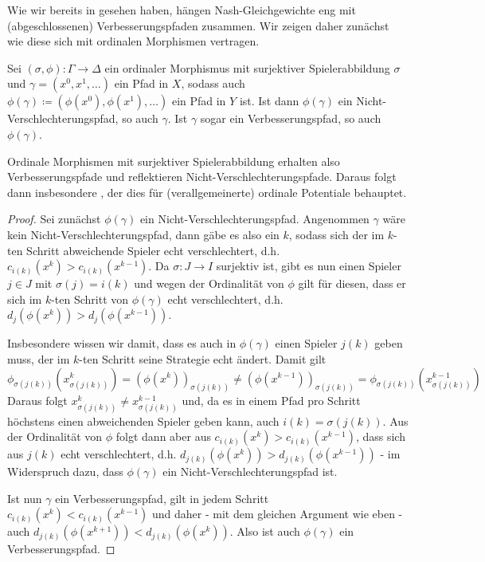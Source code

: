 Wie wir bereits in  gesehen haben, hängen Nash-Gleichgewichte eng mit (abgeschlossenen) Verbesserungspfaden zusammen. Wir zeigen daher zunächst wie diese sich mit ordinalen Morphismen vertragen.

\begin{prop}\label{prop:NVReflVerbErh}
	Sei $(\sigma, \phi): \Gamma \to \Delta$ ein ordinaler Morphismus mit surjektiver Spielerabbildung $\sigma$ und $\gamma = (x^0, x^1, \dots)$ ein Pfad in $X$, sodass auch $\phi(\gamma) \coloneqq (\phi(x^0), \phi(x^1), \dots)$ ein Pfad in $Y$ ist. Ist dann $\phi(\gamma)$ ein Nicht-Verschlechterungspfad, so auch $\gamma$. Ist $\gamma$ sogar ein Verbesserungspfad, so auch $\phi(\gamma)$.
\end{prop}

Ordinale Morphismen mit surjektiver Spielerabbildung erhalten also Verbesserungspfade und reflektieren Nicht-Verschlechterungspfade. Daraus folgt dann insbesondere , der dies für (verallgemeinerte) ordinale Potentiale behauptet.

\begin{proof}
	Sei zunächst $\phi(\gamma)$ ein Nicht-Verschlechterungspfad. Angenommen $\gamma$ wäre kein Nicht-Verschlechterungspfad, dann gäbe es also ein $k$, sodass sich der im $k$-ten Schritt abweichende Spieler echt verschlechtert, d.h. $c_{i(k)}(x^k) > c_{i(k)}(x^{k-1})$. Da $\sigma: J \to I$ surjektiv ist, gibt es nun einen Spieler $j \in J$ mit $\sigma(j) = i(k)$ und wegen der Ordinalität von $\phi$ gilt für diesen, dass er sich im $k$-ten Schritt von $\phi(\gamma)$ echt verschlechtert, d.h. $d_j(\phi(x^k)) > d_j(\phi(x^{k-1}))$. 
	
	Insbesondere wissen wir damit, dass es auch in $\phi(\gamma)$ einen Spieler $j(k)$ geben muss, der im $k$-ten Schritt seine Strategie echt ändert. Damit gilt
		\[\phi_{\sigma(j(k))}\left(x_{\sigma(j(k))}^k\right) = \left(\phi(x^k)\right)_{\sigma(j(k))} \neq \left(\phi(x^{k-1})\right)_{\sigma(j(k))} = \phi_{\sigma(j(k))}\left(x_{\sigma(j(k))}^{k-1}\right)\]
	Daraus folgt $x_{\sigma(j(k))}^k \neq x_{\sigma(j(k))}^{k-1}$ und, da es in einem Pfad pro Schritt höchstens einen abweichenden Spieler geben kann, auch $i(k) = \sigma(j(k))$. Aus der Ordinalität von $\phi$ folgt dann aber aus $c_{i(k)}(x^k) > c_{i(k)}(x^{k-1})$, dass sich aus $j(k)$ echt verschlechtert, d.h. $d_{j(k)}(\phi(x^k)) > d_{j(k)}(\phi(x^{k-1}))$ - im Widerspruch dazu, dass $\phi(\gamma)$ ein Nicht-Verschlechterungspfad ist.

	Ist nun $\gamma$ ein Verbesserungspfad, gilt in jedem Schritt $c_{i(k)}(x^{k}) < c_{i(k)}(x^{k-1})$ und daher - mit dem gleichen Argument wie eben - auch $d_{j(k)}(\phi(x^{k+1})) < d_{j(k)}(\phi(x^k))$. Also ist auch $\phi(\gamma)$ ein Verbesserungspfad.
\end{proof}

